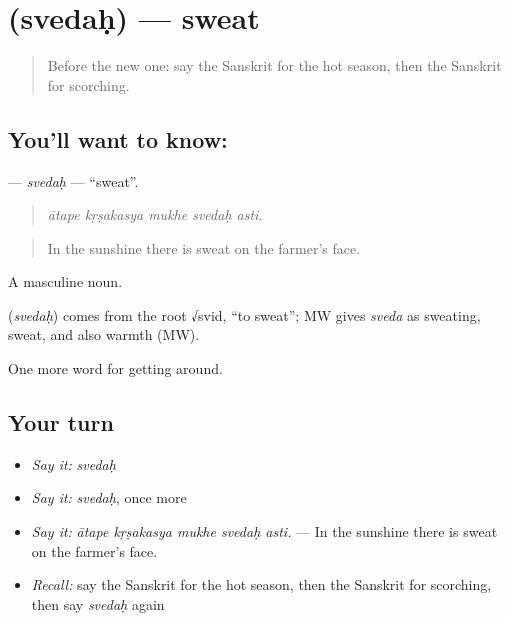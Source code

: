 \section[\texorpdfstring{\sk{स्वेदः} (svedaḥ)}{स्वेदः (svedaḥ)}]{ (svedaḥ) — sweat}

\label{lesson:SA-C438-svedah}



\begin{quote}
Before the new one: say the Sanskrit for the hot season, then the Sanskrit for scorching.
\end{quote}

\subsection*{You'll want to know: }
\textbf{} — \emph{svedaḥ} — \textquotedblleft{}sweat\textquotedblright{}.

\begin{quote}
    
\end{quote}

\begin{quote}
\emph{ātape kṛṣakasya mukhe svedaḥ asti.}
\end{quote}

\begin{quote}
In the sunshine there is sweat on the farmer's face.
\end{quote}

A masculine noun.

\begin{cousinweb}
\textbf{} (\emph{svedaḥ}) comes from the root √svid, \textquotedblleft{}to sweat\textquotedblright{}; MW gives \emph{sveda} as sweating, sweat, and also warmth (MW).
\end{cousinweb}

\begin{grammarlens}[title={What you've built}]
One more word for getting around.
\end{grammarlens}

\subsection*{Your turn}
\begin{itemize}
\raggedright
  \item \emph{Say it:} \emph{svedaḥ}
  \item \emph{Say it:} \emph{svedaḥ}, once more
  \item \emph{Say it:} \emph{ātape kṛṣakasya mukhe svedaḥ asti.} — In the sunshine there is sweat on the farmer's face.
  \item \emph{Recall:} say the Sanskrit for the hot season, then the Sanskrit for scorching, then say \emph{svedaḥ} again
\end{itemize}


